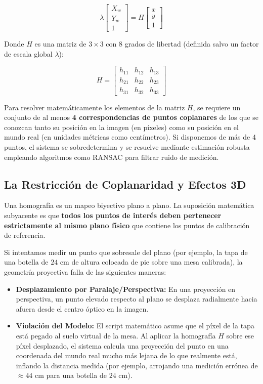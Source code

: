 \documentclass[12pt,a4paper]{article}
\begin{document}
\begin{equation}
    \lambda \begin{bmatrix} X_w \\ Y_w \\ 1 \end{bmatrix} = H \begin{bmatrix} x \\ y \\ 1 \end{bmatrix}
\end{equation}

Donde $H$ es una matriz de $3 \times 3$ con 8 grados de libertad (definida salvo un factor de escala global $\lambda$):

\begin{equation}
    H = \begin{bmatrix}
    h_{11} & h_{12} & h_{13} \\
    h_{21} & h_{22} & h_{23} \\
    h_{31} & h_{32} & h_{33}
    \end{bmatrix}
\end{equation}

Para resolver matemáticamente los elementos de la matriz $H$, se requiere un conjunto de al menos \textbf{4 correspondencias de puntos coplanares} de los que se conozcan tanto su posición en la imagen (en píxeles) como su posición en el mundo real (en unidades métricas como centímetros). Si disponemos de más de 4 puntos, el sistema se sobredetermina y se resuelve mediante estimación robusta empleando algoritmos como RANSAC para filtrar ruido de medición.

\subsection{La Restricción de Coplanaridad y Efectos 3D}

Una homografía es un mapeo biyectivo plano a plano. La suposición matemática subyacente es que \textbf{todos los puntos de interés deben pertenecer estrictamente al mismo plano físico} que contiene los puntos de calibración de referencia.

Si intentamos medir un punto que sobresale del plano (por ejemplo, la tapa de una botella de $24\text{ cm}$ de altura colocada de pie sobre una mesa calibrada), la geometría proyectiva falla de las siguientes maneras:
\begin{itemize}
    \item \textbf{Desplazamiento por Paralaje/Perspectiva:} En una proyección en perspectiva, un punto elevado respecto al plano se desplaza radialmente hacia afuera desde el centro óptico en la imagen.
    \item \textbf{Violación del Modelo:} El script matemático asume que el píxel de la tapa está pegado al suelo virtual de la mesa. Al aplicar la homografía $H$ sobre ese píxel desplazado, el sistema calcula una proyección del punto en una coordenada del mundo real mucho más lejana de lo que realmente está, inflando la distancia medida (por ejemplo, arrojando una medición errónea de $\approx 44\text{ cm}$ para una botella de $24\text{ cm}$).
\end{itemize}
\end{document}
